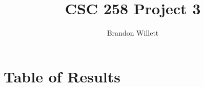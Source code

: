 \documentclass[letterpaper]{article}
\title{CSC 258 Project 3}
\author{Brandon Willett}
\begin{document}
	\maketitle

	\section{Table of Results}

	
\end{document}
